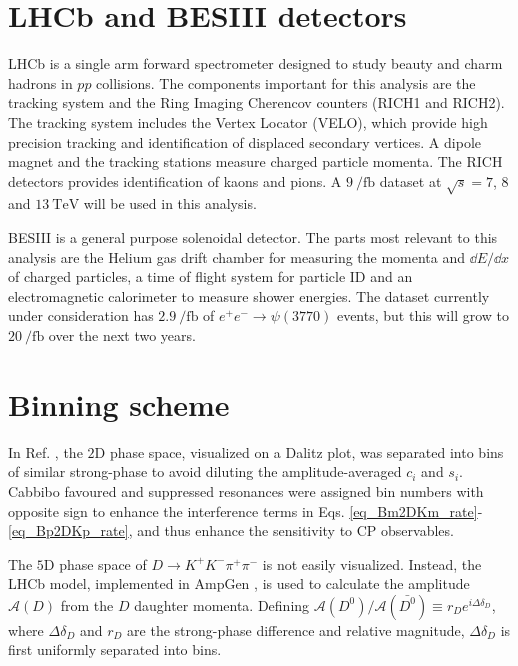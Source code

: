 \documentclass[12pt, a4paper, notitlepage, onecolumn]{article}
\begin{document}
\section{LHCb and BESIII detectors}
\noindent LHCb \cite{cite_LHCb} is a single arm forward spectrometer designed to study beauty and charm hadrons in $pp$ collisions. The components important for this analysis are the tracking system and the Ring Imaging Cherencov counters (RICH1 and RICH2). The tracking system includes the Vertex Locator (VELO), which provide high precision tracking and identification of displaced secondary vertices. A dipole magnet and the tracking stations measure charged particle momenta. The RICH detectors provides identification of kaons and pions. A $\SI{9}{\per\femto\barn}$ dataset at $\sqrt{s} = 7$, $8$ and $\SI{13}{\tera\eV}$ will be used in this analysis.

BESIII \cite{cite_BESIII} is a general purpose solenoidal detector. The parts most relevant to this analysis are the Helium gas drift chamber for measuring the momenta and $\dd{E}/\dd{x}$ of charged particles, a time of flight system for particle ID and an electromagnetic calorimeter to measure shower energies. The dataset currently under consideration has $\SI{2.9}{\per\femto\barn}$ of $e^+e^-\to\psi(3770)$ events, but this will grow to $\SI{20}{\per\femto\barn}$ over the next two years.

\section{Binning scheme}
\label{section_binning_scheme}
\noindent In Ref. \cite{cite_LHCbGGSZKSpipi}, the $2$D phase space, visualized on a Dalitz plot, was separated into bins of similar strong-phase to avoid diluting the amplitude-averaged $c_i$ and $s_i$. Cabbibo favoured and suppressed resonances were assigned bin numbers with opposite sign to enhance the interference terms in Eqs. \eqref{eq_Bm2DKm_rate}-\eqref{eq_Bp2DKp_rate}, and thus enhance the sensitivity to CP observables.

The $5$D phase space of $D\to K^+K^-\pi^+\pi^-$ is not easily visualized. Instead, the LHCb model, implemented in AmpGen \cite{cite_AmpGen}, is used to calculate the amplitude $\mathcal{A}(D)$ from the $D$ daughter momenta. Defining $\mathcal{A}(D^0)/\mathcal{A}(\bar{D^0})\equiv r_De^{i\Delta\delta_D}$, where $\Delta\delta_D$ and $r_D$ are the strong-phase difference and relative magnitude, $\Delta\delta_D$ is first uniformly separated into bins.
\end{document}
